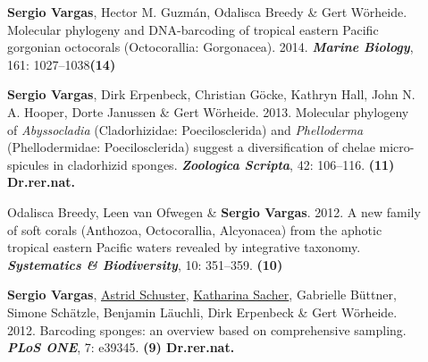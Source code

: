 \documentclass[letter,10pt]{article}
\begin{document}
\begin{description}
\item[]\textbf{Sergio Vargas}, Hector M. Guzm\'an, Odalisca Breedy \& Gert W\"orheide. Molecular phylogeny and DNA-barcoding of tropical eastern Pacific gorgonian octocorals (Octocorallia: Gorgonacea). 2014. \textbf{\emph{Marine Biology}}, 161: 1027--1038\hfill\textbf{{\scriptsize (14)}}



\item[]\textbf{Sergio Vargas}, Dirk Erpenbeck, Christian G\"ocke, Kathryn Hall, John N. A. Hooper, Dorte Janussen \& Gert W\"orheide. 2013. Molecular phylogeny of \emph{Abyssocladia} (Cladorhizidae: Poecilosclerida) and \emph{Phelloderma} (Phellodermidae: Poecilosclerida) suggest a diversification of chelae micro-spicules in cladorhizid sponges. \textbf{\emph{Zoologica Scripta}}, 42: 106--116. \hfill\textbf{{\scriptsize (11) Dr.rer.nat.}}

\item[]Odalisca Breedy, Leen van Ofwegen \& \textbf{Sergio Vargas}. 2012. A new family of soft corals (Anthozoa, Octocorallia, Alcyonacea) from the aphotic tropical eastern Pacific waters revealed by integrative taxonomy. \textbf{\emph{Systematics \& Biodiversity}}, 10: 351--359. \hfill\textbf{{\scriptsize (10)}}

\item[]\textbf{Sergio Vargas}, \underline{Astrid Schuster}, \underline{Katharina Sacher}, Gabrielle B\"uttner, Simone Sch\"atzle, Benjamin L\"auchli, Dirk Erpenbeck \& Gert W\"orheide. 2012. Barcoding sponges: an overview based on comprehensive sampling. \textbf{\emph{PLoS ONE}}, 7: e39345. \hfill\textbf{{\scriptsize (9) Dr.rer.nat.}}


\end{description}
\end{document}
